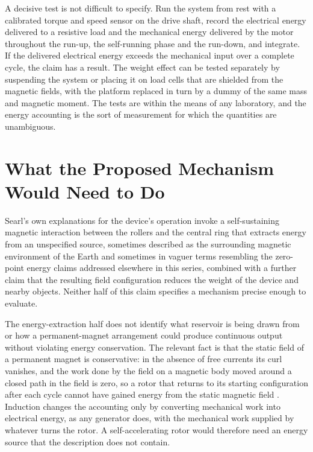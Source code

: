 \documentclass[11pt]{article}
\begin{document}
A decisive test is not difficult to specify. Run the system from rest with a calibrated torque and speed sensor on the drive shaft, record the electrical energy delivered to a resistive load and the mechanical energy delivered by the motor throughout the run-up, the self-running phase and the run-down, and integrate. If the delivered electrical energy exceeds the mechanical input over a complete cycle, the claim has a result. The weight effect can be tested separately by suspending the system or placing it on load cells that are shielded from the magnetic fields, with the platform replaced in turn by a dummy of the same mass and magnetic moment. The tests are within the means of any laboratory, and the energy accounting is the sort of measurement for which the quantities are unambiguous.

\section{What the Proposed Mechanism Would Need to Do}

Searl's own explanations for the device's operation invoke a self-sustaining magnetic interaction between the rollers and the central ring that extracts energy from an unspecified source, sometimes described as the surrounding magnetic environment of the Earth and sometimes in vaguer terms resembling the zero-point energy claims addressed elsewhere in this series, combined with a further claim that the resulting field configuration reduces the weight of the device and nearby objects. Neither half of this claim specifies a mechanism precise enough to evaluate.

The energy-extraction half does not identify what reservoir is being drawn from or how a permanent-magnet arrangement could produce continuous output without violating energy conservation. The relevant fact is that the static field of a permanent magnet is conservative: in the absence of free currents its curl vanishes, and the work done by the field on a magnetic body moved around a closed path in the field is zero, so a rotor that returns to its starting configuration after each cycle cannot have gained energy from the static magnetic field \cite{J1999}. Induction changes the accounting only by converting mechanical work into electrical energy, as any generator does, with the mechanical work supplied by whatever turns the rotor. A self-accelerating rotor would therefore need an energy source that the description does not contain.
\end{document}
